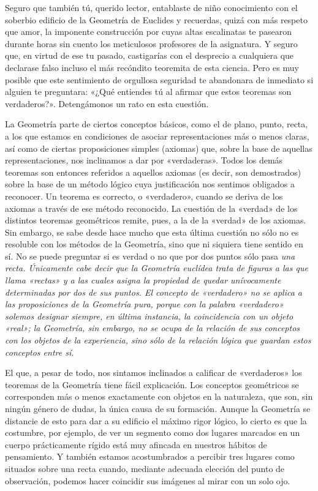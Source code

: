 \documentclass[spanish]{book}
\begin{document}
Seguro que también tú, querido lector, entablaste de niño conocimiento con el
soberbio edificio de la Geometría de Euclides y recuerdas, quizá con más respeto que
amor, la imponente construcción por cuyas altas escalinatas te pasearon durante horas
sin cuento los meticulosos profesores de la asignatura. Y seguro que, en virtud de ese
tu pasado, castigarías con el desprecio a cualquiera que declarase falso incluso el más
recóndito teoremita de esta ciencia. Pero es muy posible que este sentimiento de
orgullosa seguridad te abandonara de inmediato si alguien te preguntara: «¿Qué
entiendes tú al afirmar que estos teoremas son verdaderos?». Detengámonos un rato
en esta cuestión.

La Geometría parte de ciertos conceptos básicos, como el de plano, punto, recta, a
los que estamos en condiciones de asociar representaciones más o menos claras, así
como de ciertas proposiciones simples (axiomas) que, sobre la base de aquellas
representaciones, nos inclinamos a dar por «verdaderas». Todos los demás teoremas
son entonces referidos a aquellos axiomas (es decir, son demostrados) sobre la base de
un método lógico cuya justificación nos sentimos obligados a reconocer. Un teorema
es correcto, o «verdadero», cuando se deriva de los axiomas a través de ese método
reconocido. La cuestión de la «verdad» de los distintos teoremas geométricos remite,
pues, a la de la «verdad» de los axiomas. Sin embargo, se sabe desde hace mucho que
esta última cuestión no sólo no es resoluble con los métodos de la Geometría, sino que
ni siquiera tiene sentido en sí. No se puede preguntar si es verdad o no que por dos
puntos sólo pasa \em{una recta}. Únicamente cabe decir que la Geometría euclídea trata de
figuras a las que llama «rectas» y a las cuales asigna la propiedad de quedar
unívocamente determinadas por dos de sus puntos. El concepto de «verdadero» no se
aplica a las proposiciones de la Geometría pura, porque con la palabra «verdadero»
solemos designar siempre, en última instancia, la coincidencia con un objeto «real»; la
Geometría, sin embargo, no se ocupa de la relación de sus conceptos con los objetos
de la experiencia, sino sólo de la relación lógica que guardan estos conceptos entre sí.

El que, a pesar de todo, nos sintamos inclinados a calificar de «verdaderos» los
teoremas de la Geometría tiene fácil explicación. Los conceptos geométricos se
corresponden más o menos exactamente con objetos en la naturaleza, que son, sin
ningún género de dudas, la única causa de su formación. Aunque la Geometría se
distancie de esto para dar a su edificio el máximo rigor lógico, lo cierto es que la
costumbre, por ejemplo, de ver un segmento como dos lugares marcados en un cuerpo
prácticamente rígido está muy afincada en nuestros hábitos de pensamiento. Y
también estamos acostumbrados a percibir tres lugares como situados sobre una recta
cuando, mediante adecuada elección del punto de observación, podemos hacer
coincidir sus imágenes al mirar con un solo ojo.
\end{document}
